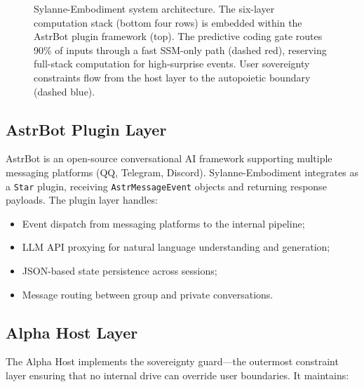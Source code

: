 \documentclass[10pt,twocolumn]{article}
\begin{document}
\begin{figure}[t]
\caption{Sylanne-Embodiment system architecture. The six-layer computation stack (bottom four rows) is embedded within the AstrBot plugin framework (top). The predictive coding gate routes 90\% of inputs through a fast SSM-only path (dashed red), reserving full-stack computation for high-surprise events. User sovereignty constraints flow from the host layer to the autopoietic boundary (dashed blue).}
\label{fig:architecture}
\end{figure}

\subsection{AstrBot Plugin Layer}

AstrBot is an open-source conversational AI framework supporting multiple messaging platforms (QQ, Telegram, Discord). Sylanne-Embodiment integrates as a \texttt{Star} plugin, receiving \texttt{AstrMessageEvent} objects and returning response payloads. The plugin layer handles:

\begin{itemize}[nosep,leftmargin=*]
\item Event dispatch from messaging platforms to the internal pipeline;
\item LLM API proxying for natural language understanding and generation;
\item JSON-based state persistence across sessions;
\item Message routing between group and private conversations.
\end{itemize}

\subsection{Alpha Host Layer}

The Alpha Host implements the sovereignty guard---the outermost constraint layer ensuring that no internal drive can override user boundaries. It maintains:
\end{document}
